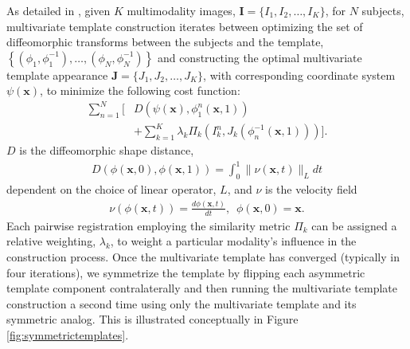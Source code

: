 \documentclass[preprint,authoryear,review,12pt]{elsarticle}
\begin{document}
As detailed in \cite{avants2008,avants2010}, 
given $K$ multimodality images, ${\mathbf I} = \{I_1,I_2,\ldots, I_K\}$, 
for $N$ subjects,  multivariate 
template construction iterates between optimizing the set 
of diffeomorphic transforms between the subjects and the 
template, 
$\left\{\left(\phi_1,\phi_1^{-1}\right),\ldots,\left(\phi_N,\phi_N^{-1}\right)\right\}$ 
and constructing the 
optimal multivariate template appearance 
$\mathbf{J}=\{J_1,J_2,\ldots, J_K\}$, with corresponding 
coordinate system $\psi(\mathbf{x})$, to minimize the
following cost function:
\begin{align}
  \label{test}
  \sum_{n=1}^N \Bigg[ &D \left( \psi(\mathbf{x}),\phi_1^n(\mathbf{x},1)\right) \nonumber  \\
           &+ \sum_{k=1}^K \lambda_k \Pi_k \left(I_k^n,J_k   
           \left(\phi^{-1}_n(\mathbf{x},1)\right)\right)\Bigg].
\end{align}
$D$ is the diffeomorphic shape distance,
\begin{align}
D\left( \phi( \mathbf{x},0),\phi( \mathbf{x},1)\right) = \int_0^1 \| \nu(\mathbf{x},t)\|_L dt
\end{align}
dependent on the choice of linear operator, $L$, and $\nu$
is the velocity field
\begin{align}
\nu\left( \phi(\mathbf{x},t) \right) = \frac{d\phi(\mathbf{x},t)}{dt},\,\,\, \phi(\mathbf{x},0) = \mathbf{x}.
\end{align}
Each pairwise registration employing the similarity metric $\Pi_k$ can 
be assigned a relative weighting, $\lambda_k$, to weight a particular
modality's influence in the construction process.  Once the multivariate
template has converged (typically in four iterations), we symmetrize
the template by flipping each asymmetric template component contralaterally 
and then running the
multivariate template construction a second time using only the multivariate
template and its symmetric analog.  This is illustrated conceptually in
Figure \ref{fig:symmetrictemplates}.
\end{document}
